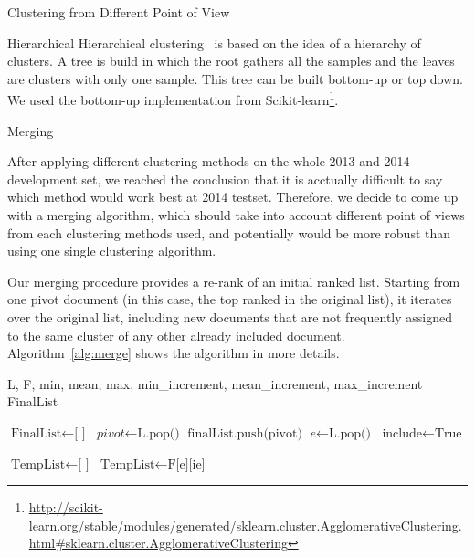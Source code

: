\begin{subsection}{Clustering from Different Point of View}
\begin{subsubsection}{Hierarchical}
Hierarchical clustering~\cite{hierarchical} is based on the idea of a hierarchy of clusters. A tree is build in which the root gathers all the samples and the leaves are clusters with only one sample. This tree can be built bottom-up or top down. We used the bottom-up implementation from Scikit-learn\footnote{\url{http://scikit-learn.org/stable/modules/generated/sklearn.cluster.AgglomerativeClustering.html#sklearn.cluster.AgglomerativeClustering}}.

\end{subsubsection}

\begin{subsubsection}{Merging}

After applying different clustering methods on the whole 2013 and 2014 development set, 
we reached the conclusion that it is acctually difficult to say which method would work best at 2014 testset.
Therefore, we decide to come up with a merging algorithm, which should take into account different point of views from each clustering methods used,
and potentially would be more robust than using one single clustering algorithm.

Our merging procedure provides a re-rank of an initial ranked list. Starting from one pivot document (in this case, the top ranked in the original list), 
it iterates over the original list, including new documents that are not frequently assigned to the same cluster of any other already included document. 
Algorithm~\ref{alg:merge} shows the algorithm in more details.


\renewcommand{\algorithmicrequire}{\textbf{Input:}}
\renewcommand{\algorithmicensure}{\textbf{Output:}}
\newcommand{\algorithmicbreak}{\textbf{break}}
\newcommand{\Break}{\State \algorithmicbreak}
\algrenewcommand\Return{\State \algorithmicreturn{} }%
\begin{algorithm}
\caption{Merging of different clustering methods}
\label{alg:merge}
\begin{algorithmic}[1]
\Require L, F, min, mean, max, min\_increment, mean\_increment, max\_increment
\Ensure FinalList 

\State $\text{FinalList} \gets \text{[ ]}$
\State $\textit{pivot} \gets \text{L.pop()}$
\State $\text{finalList.push(pivot)}$
\State $\textit{e} \gets \text{L.pop()}$
\State $\text{include} \gets \text{True}$

\State $\text{TempList} \gets \text{[ ]}$
\State $\text{TempList} \gets \text{F[e][ie]}$
\EndFor


\end{algorithmic}
\end{algorithm}
\end{subsubsection}
\end{subsection}
